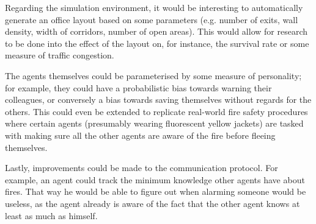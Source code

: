 \documentclass[a4paper]{article}
\begin{document}
Regarding the simulation environment, it
would be interesting to automatically generate an office layout based on some
parameters (e.g. number of exits, wall density, width of corridors, number of
open areas). This would allow for research to be done into the effect of the
layout on, for instance, the survival rate or some measure of traffic congestion.

The agents themselves could be parameterised by some measure of personality; for
example, they could have a probabilistic bias towards warning their colleagues,
or conversely a bias towards saving themselves without regards for the others.
This could even be extended to replicate real-world fire safety procedures where
certain agents (presumably wearing fluorescent yellow jackets) are tasked with
making sure all the other agents are aware of the fire before fleeing themselves.

Lastly, improvements could be made to the communication protocol. For example, an agent could track the minimum knowledge other agents have about fires. That way he would be able to figure out when alarming someone would be useless, as the agent already is aware of the fact that the other agent knows at least as much as himself.
\end{document}
